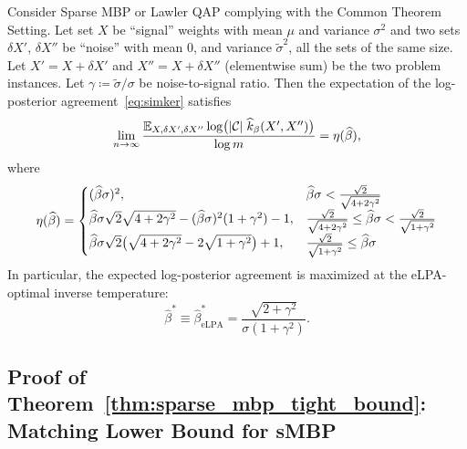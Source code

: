 \begin{theorem}\label{thm:gen_capacity_lqap_smbp}
Consider Sparse MBP or Lawler QAP complying with the Common Theorem Setting. Let
set $X$ be ``signal'' weights with mean ${\mu}$ and variance ${\sigma}^2$ and
two sets $\delta X'$, $\delta X''$ be ``noise'' with mean $0$, and variance
$\tilde{\sigma}^2$, all the sets of the same size. Let $X'=X+\delta X'$ and
$X''=X+\delta X''$ (elementwise sum) be the two problem instances. Let 
$\gamma \coloneqq \tilde\sigma/\sigma$ be noise-to-signal ratio. Then the expectation 
of the log-posterior agreement~\eqref{eq:simker} satisfies
\begin{equation}
  \lim_{n\to \infty} 
  \frac{\mathbb{E}_{X,\delta X',\delta X''} \log\bigl(|{\cal C}|\;
      \widehat{k}_\beta(X', X'') \bigr)}
  {\log m}
    = \eta(\widehat{\beta}),
\end{equation}
where
\begin{equation}\label{eq:gc_three_phases}
  \eta(\widehat{\beta}) =
  \begin{cases}
    (\widehat{\beta}{\sigma})^2, & \widehat{\beta} {\sigma} < \frac{\sqrt{2}}{\sqrt{4+2\gamma^2}} \\
    \widehat{\beta}{\sigma}\sqrt{2}\sqrt{4+2\gamma^2} - (\widehat{\beta}{\sigma})^2(1+\gamma^2) - 1, 
      & \frac{\sqrt{2}}{\sqrt{4+2\gamma^2}} 
        \leq \widehat{\beta}{\sigma}
        < \frac{\sqrt{2}}{\sqrt{1+\gamma^2}} \\
    \widehat{\beta}{\sigma}\sqrt{2}
      \bigl(\sqrt{4+2\gamma^2} 
        - 2\sqrt{1+\gamma^2}\bigr) + 1, 
      & \frac{\sqrt{2}}{\sqrt{1+\gamma^2}} \leq \widehat{\beta}{\sigma}
  \end{cases}
\end{equation}
In particular, the expected log-posterior agreement is maximized at the eLPA-optimal
inverse temperature:
\begin{equation}\label{eq:elpa_optimal_temperature}
  \hat{\beta}^* \equiv \hat{\beta}^*_{\mathrm{eLPA}} = \frac{\sqrt{2+\gamma^2}}{\sigma(1+\gamma^2)}.
\end{equation}
%
\end{theorem}

\subsection{Proof of Theorem~\ref{thm:sparse_mbp_tight_bound}: Matching Lower Bound 
for sMBP}
\label{sec:free_smbp_lowerbound_proof}

